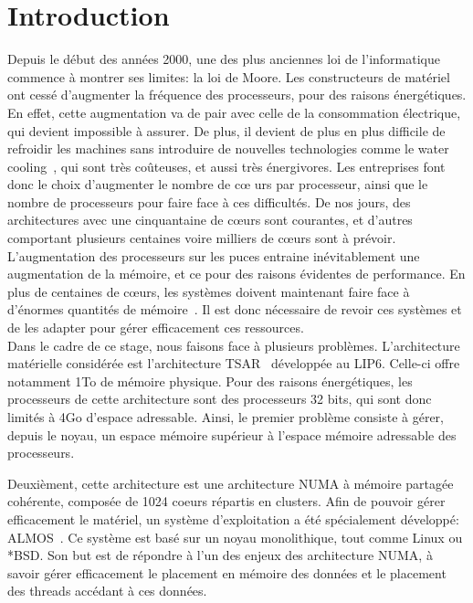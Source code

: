\chapter{Introduction}

  \hspace{1cm}Depuis le début des années 2000, une des plus anciennes loi de
  l'informatique commence à montrer ses limites: la loi de Moore. Les
  constructeurs de matériel ont cessé d'augmenter la fréquence des processeurs,
  pour des raisons énergétiques. En effet, cette augmentation va de pair avec
  celle de la consommation électrique, qui devient impossible à assurer. De
  plus, il devient de plus en plus difficile de refroidir les machines sans
  introduire de nouvelles technologies comme le water
  cooling~\citep{googleXXXXdatacenters}, qui sont très coûteuses, et aussi très
  énergivores. Les entreprises font donc le choix d'augmenter le nombre de c\oe
  urs par processeur, ainsi que le nombre de processeurs pour faire face à ces
  difficultés. De nos jours, des architectures avec une cinquantaine de c\oe urs
  sont courantes, et d'autres comportant plusieurs centaines voire milliers de
  c\oe urs sont à prévoir. L'augmentation des processeurs sur les puces entraine
  inévitablement une augmentation de la mémoire, et ce pour des raisons
  évidentes de performance. En plus de centaines de c\oe urs, les systèmes
  doivent maintenant faire face à d'énormes quantités de
  mémoire~\citep{hp2012z820, puget2013z9pe}. Il est donc nécessaire de revoir
  ces systèmes et de les adapter pour gérer efficacement ces ressources.\\

  \hspace{1cm} Dans le cadre de ce stage, nous faisons face à plusieurs
  problèmes. L'architecture matérielle considérée est l'architecture
  TSAR~\citep{greiner2009tsar} développée au LIP6. Celle-ci offre notamment 1To
  de mémoire physique. Pour des raisons énergétiques, les processeurs de cette
  architecture sont des processeurs 32 bits, qui sont donc limités à 4Go
  d'espace adressable. Ainsi, le premier problème consiste à gérer, depuis le
  noyau, un espace mémoire supérieur à l'espace mémoire adressable des
  processeurs.

  Deuxièment, cette architecture est une architecture NUMA à mémoire partagée
  cohérente, composée de 1024 coeurs répartis en clusters. Afin de pouvoir gérer
  efficacement le matériel, un système d'exploitation a été spécialement
  développé: ALMOS~\citep{almaless2011almos}. Ce système est basé sur un noyau
  monolithique, tout comme Linux ou *BSD. Son but est de répondre à l'un des
  enjeux des architecture NUMA, à savoir gérer efficacement le placement en
  mémoire des données et le placement des threads accédant à ces
  données. 

